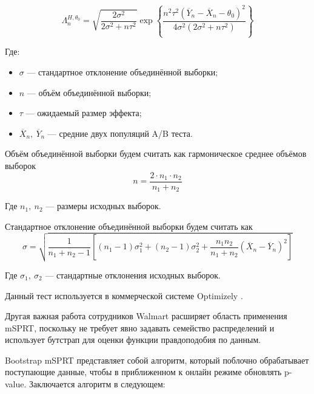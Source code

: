 \documentclass[../document.tex]{subfiles}
\begin{document}
	\begin{equation}
		\label{eqn:mSPRT}
		\Lambda_{n}^{H,\theta_0} = \sqrt{\frac{2\sigma^2}{2\sigma^2 +n\tau^2}} \exp\left\{\frac{n^2\tau^2 (\overline{Y}_n-\overline{X}_n-\theta_0)^2}{4\sigma^2(2\sigma^2+n\tau^2)}\right\}
	\end{equation}
	\par Где:
	\begin{itemize}
		\item $\sigma$ --- стандартное отклонение объединённой выборки;
		\item $n$ --- объём объединённой выборки;
		\item $\tau$ --- ожидаемый размер эффекта;
		\item $\overline{X}_n,\ \overline{Y}_n$ --- средние двух популяций A/B теста.
	\end{itemize}
	\par Объём объединённой выборки будем считать как гармоническое среднее объёмов выборок \cite{welch_robust}
	\begin{equation}
		n=\frac{2\cdot n_1\cdot n_2}{n_1+n_2}
	\end{equation}
	\par Где $n_1,\ n_2$ --- размеры исходных выборок.
	\par Стандартное отклонение объединённой выборки будем считать как \cite{neil_sampling}
	\begin{equation}
		\sigma = \sqrt{\frac{1}{n_1+n_2-1}\left[(n_1-1)\sigma_1^2+(n_2-1)\sigma_2^2 +\frac{n_1 n_2}{n_1+n_2}(\overline{X}_n - \overline{Y}_n)^2\right]}
	\end{equation}
	\par Где $\sigma_1,\ \sigma_2$ --- стандартные отклонения исходных выборок.
	\par Данный тест используется в коммерческой системе Optimizely \cite{optimizely}.
	\par Другая важная работа \cite{bootstrap_msprt} сотрудников Walmart расширяет область применения mSPRT, поскольку не требует явно задавать семейство распределений и использует бутстрап для оценки функции правдоподобия по данным.
	\par Bootstrap mSPRT представляет собой алгоритм, который поблочно обрабатывает поступающие данные, чтобы в приближенном к онлайн режиме обновлять p-value. Заключается алгоритм в следующем:
\end{document}
